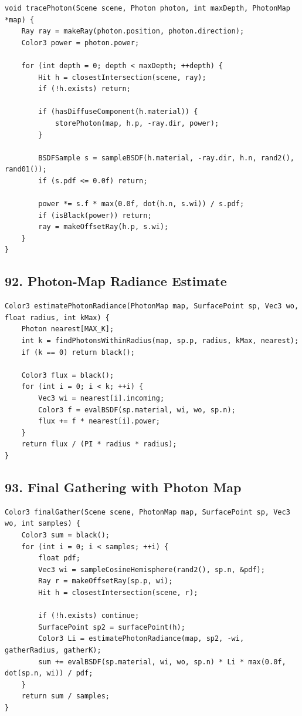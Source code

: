 \documentclass[10pt,letterpaper]{article}
\begin{document}
\begin{verbatim}
void tracePhoton(Scene scene, Photon photon, int maxDepth, PhotonMap *map) {
    Ray ray = makeRay(photon.position, photon.direction);
    Color3 power = photon.power;

    for (int depth = 0; depth < maxDepth; ++depth) {
        Hit h = closestIntersection(scene, ray);
        if (!h.exists) return;

        if (hasDiffuseComponent(h.material)) {
            storePhoton(map, h.p, -ray.dir, power);
        }

        BSDFSample s = sampleBSDF(h.material, -ray.dir, h.n, rand2(), rand01());
        if (s.pdf <= 0.0f) return;

        power *= s.f * max(0.0f, dot(h.n, s.wi)) / s.pdf;
        if (isBlack(power)) return;
        ray = makeOffsetRay(h.p, s.wi);
    }
}
\end{verbatim}

\subsection{92. Photon-Map Radiance Estimate}

\begin{verbatim}
Color3 estimatePhotonRadiance(PhotonMap map, SurfacePoint sp, Vec3 wo, float radius, int kMax) {
    Photon nearest[MAX_K];
    int k = findPhotonsWithinRadius(map, sp.p, radius, kMax, nearest);
    if (k == 0) return black();

    Color3 flux = black();
    for (int i = 0; i < k; ++i) {
        Vec3 wi = nearest[i].incoming;
        Color3 f = evalBSDF(sp.material, wi, wo, sp.n);
        flux += f * nearest[i].power;
    }
    return flux / (PI * radius * radius);
}
\end{verbatim}

\subsection{93. Final Gathering with Photon Map}

\begin{verbatim}
Color3 finalGather(Scene scene, PhotonMap map, SurfacePoint sp, Vec3 wo, int samples) {
    Color3 sum = black();
    for (int i = 0; i < samples; ++i) {
        float pdf;
        Vec3 wi = sampleCosineHemisphere(rand2(), sp.n, &pdf);
        Ray r = makeOffsetRay(sp.p, wi);
        Hit h = closestIntersection(scene, r);

        if (!h.exists) continue;
        SurfacePoint sp2 = surfacePoint(h);
        Color3 Li = estimatePhotonRadiance(map, sp2, -wi, gatherRadius, gatherK);
        sum += evalBSDF(sp.material, wi, wo, sp.n) * Li * max(0.0f, dot(sp.n, wi)) / pdf;
    }
    return sum / samples;
}
\end{verbatim}
\end{document}
